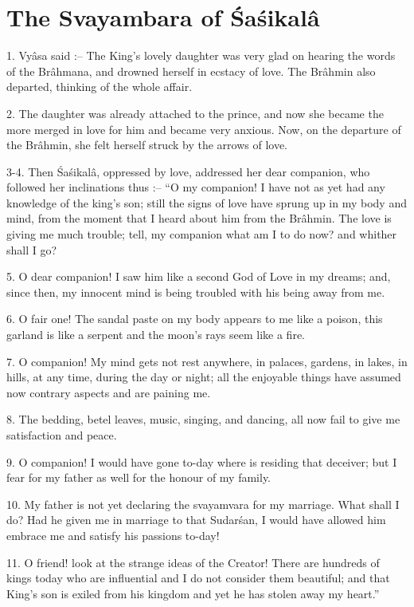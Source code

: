 ﻿\chapter{The Svayambara of \'Sa\'sikal\^a}

1. Vy\^asa said :-- The King's lovely daughter was very glad on hearing the words of the Br\^ahmana, and drowned herself in ecstacy of love. The Br\^ahmin also departed, thinking of the whole affair.

2. The daughter was already attached to the prince, and now she became the more merged in love for him and became very anxious. Now, on the departure of the Br\^ahmin, she felt herself struck by the arrows of love.

3-4. Then \'Sa\'sikal\^a, oppressed by love, addressed her dear companion, who followed her inclinations thus :-- ``O my companion! I have not as yet had any knowledge of the king's son; still the signs of love have sprung up in my body and mind, from the moment that I heard about him from the Br\^ahmin. The love is giving me much trouble; tell, my companion what am I to do now? and whither shall I go?

5. O dear companion! I saw him like a second God of Love in my dreams; and, since then, my innocent mind is being troubled with his being away from me.

6. O fair one! The sandal paste on my body appears to me like a poison, this garland is like a serpent and the moon's rays seem like a fire.

7. O companion! My mind gets not rest anywhere, in palaces, gardens, in lakes, in hills, at any time, during the day or night; all the enjoyable things have assumed now contrary aspects and are paining me.

8. The bedding, betel leaves, music, singing, and dancing, all now fail to give me satisfaction and peace.

9. O companion! I would have gone to-day where is residing that deceiver; but I fear for my father as well for the honour of my family.

10. My father is not yet declaring the svayamvara for my marriage. What shall I do? Had he given me in marriage to that Sudar\'san, I would have allowed him embrace me and satisfy his passions to-day!

11. O friend! look at the strange ideas of the Creator! There are hundreds of kings today who are influential and I do not consider them beautiful; and that King's son is exiled from his kingdom and yet he has stolen away my heart.''

